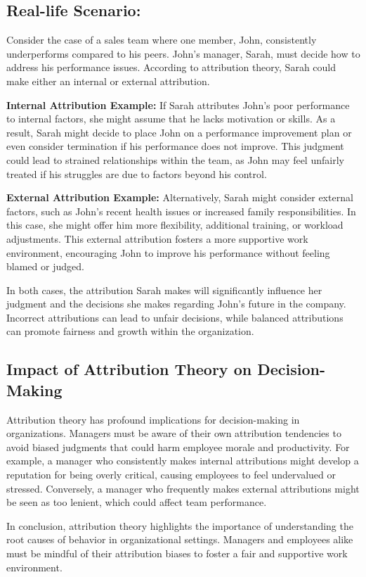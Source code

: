 \documentclass{article}
\begin{document}
\subsection*{Real-life Scenario:}
Consider the case of a sales team where one member, John, consistently underperforms compared to his peers. John's manager, Sarah, must decide how to address his performance issues. According to attribution theory, Sarah could make either an internal or external attribution.

\textbf{Internal Attribution Example:}  
If Sarah attributes John's poor performance to internal factors, she might assume that he lacks motivation or skills. As a result, Sarah might decide to place John on a performance improvement plan or even consider termination if his performance does not improve. This judgment could lead to strained relationships within the team, as John may feel unfairly treated if his struggles are due to factors beyond his control.

\textbf{External Attribution Example:}  
Alternatively, Sarah might consider external factors, such as John's recent health issues or increased family responsibilities. In this case, she might offer him more flexibility, additional training, or workload adjustments. This external attribution fosters a more supportive work environment, encouraging John to improve his performance without feeling blamed or judged.

In both cases, the attribution Sarah makes will significantly influence her judgment and the decisions she makes regarding John's future in the company. Incorrect attributions can lead to unfair decisions, while balanced attributions can promote fairness and growth within the organization.

\subsection*{Impact of Attribution Theory on Decision-Making}
Attribution theory has profound implications for decision-making in organizations. Managers must be aware of their own attribution tendencies to avoid biased judgments that could harm employee morale and productivity. For example, a manager who consistently makes internal attributions might develop a reputation for being overly critical, causing employees to feel undervalued or stressed. Conversely, a manager who frequently makes external attributions might be seen as too lenient, which could affect team performance.

In conclusion, attribution theory highlights the importance of understanding the root causes of behavior in organizational settings. Managers and employees alike must be mindful of their attribution biases to foster a fair and supportive work environment.
\end{document}
